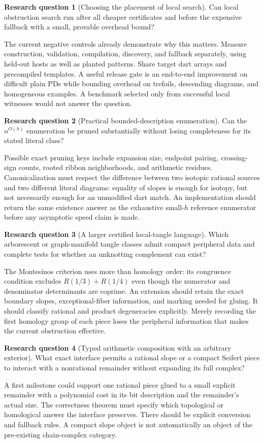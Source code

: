 \documentclass[11pt,a4paper]{article}
\theoremstyle{definition}
\newtheorem{researchquestion}{Research question}
\theoremstyle{remark}
\numberwithin{equation}{section}
\begin{document}
\begin{researchquestion}[Choosing the placement of local search]
Can local obstruction search run after all cheaper certificates and before
the expensive fallback with a small, provable overhead bound?
\end{researchquestion}
The current negative controls already demonstrate why this matters.
Measure construction, validation, compilation, discovery, and fallback
separately, using held-out hosts as well as planted patterns. Share target
dart arrays and precompiled templates. A useful release gate is an
end-to-end improvement on difficult plain PDs while bounding overhead on
trefoils, descending diagrams, and homogeneous examples. A benchmark
selected only from successful local witnesses would not answer the question.

\begin{researchquestion}[Practical bounded-description enumeration]
Can the \(n^{O(h)}\) enumeration be pruned substantially without losing
completeness for its stated literal class?
\end{researchquestion}
Possible exact pruning keys include expansion size, endpoint pairing,
crossing-sign counts, rooted ribbon neighborhoods, and arithmetic residues.
Canonicalization must respect the difference between two isotopic rational
sources and two different literal diagrams: equality of slopes is enough
for isotopy, but not necessarily enough for an unmodified dart match.
An implementation should return the same existence answer as the exhaustive
small-\(h\) reference enumerator before any asymptotic speed claim is made.

\begin{researchquestion}[A larger certified local-tangle language]
Which arborescent or graph-manifold tangle classes admit compact peripheral
data and complete tests for whether an unknotting complement can exist?
\end{researchquestion}
The Montesinos criterion uses more than homology order: its congruence
condition excludes \(R(1/3)+R(1/4)\) even though the numerator and denominator
determinants are coprime. An extension should retain the exact boundary
slopes, exceptional-fiber information, and marking needed for gluing.
It should classify rational and product degeneracies explicitly. Merely
recording the first homology group of each piece loses the peripheral
information that makes the current obstruction effective.

\begin{researchquestion}[Typed arithmetic composition with an arbitrary exterior]
What exact interface permits a rational slope or a compact Seifert piece
to interact with a nonrational remainder without expanding its full complex?
\end{researchquestion}
A first milestone could support one rational piece glued to a small explicit
remainder with a polynomial cost in its bit description and the remainder's
actual size. The correctness theorem must specify which topological or
homological answer the interface preserves. There should be explicit
conversion and fallback rules. A compact slope object is not automatically
an object of the pre-existing chain-complex category.
\end{document}
